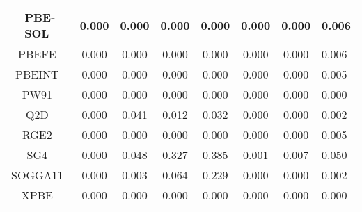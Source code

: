 \begin{tabular}{|c|c|c|c|c|c|c|l|}
                                 PBE-SOL~\cite{Perdew2008_136406} &                0.000 &                          0.000 &             0.000 &                        0.000 &                0.000 &                0.000 &                       0.006 \\ \hline
                                      PBEFE~\cite{Perez2015_3844} &                0.000 &                          0.000 &             0.000 &                        0.000 &                0.000 &                0.000 &                       0.006 \\ \hline
                                 PBEINT~\cite{Fabiano2010_113104} &                0.000 &                          0.000 &             0.000 &                        0.000 &                0.000 &                0.000 &                       0.005 \\ \hline
       PW91~\cite{Perdew1991,Perdew1992_6671,Perdew1992_6671_err} &                0.000 &                          0.000 &             0.000 &                        0.000 &                0.000 &                0.000 &                       0.000 \\ \hline
                                     Q2D~\cite{Chiodo2012_126402} &                0.000 &                          0.041 &             0.012 &                        0.032 &                0.000 &                0.000 &                       0.002 \\ \hline
                                   RGE2~\cite{Ruzsinszky2009_763} &                0.000 &                          0.000 &             0.000 &                        0.000 &                0.000 &                0.000 &                       0.005 \\ \hline
                                 SG4~\cite{Constantin2016_045126} &                0.000 &                          0.048 &             0.327 &                        0.385 &                0.001 &                0.007 &                       0.050 \\ \hline
                                 SOGGA11~\cite{Peverati2011_1991} &                0.000 &                          0.003 &             0.064 &                        0.229 &                0.000 &                0.000 &                       0.002 \\ \hline
                                          XPBE~\cite{Xu2004_4068} &                0.000 &                          0.000 &             0.000 &                        0.000 &                0.000 &                0.000 &                       0.000 \\ \hline

\end{tabular}
